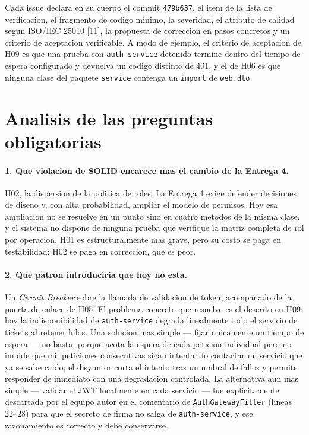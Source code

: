 \documentclass[10pt,a4paper]{article}
\newcommand{\commitCorto}{479b637}
\begin{document}
\noindent Cada issue declara en su cuerpo el commit \texttt{\commitCorto}, el item de la
lista de verificacion, el fragmento de codigo minimo, la severidad, el atributo de calidad
segun ISO/IEC 25010 [11], la propuesta de correccion en pasos concretos y un criterio de
aceptacion verificable. A modo de ejemplo, el criterio de aceptacion de H09 es que una
prueba con \texttt{auth-service} detenido termine dentro del tiempo de espera configurado y
devuelva un codigo distinto de 401, y el de H06 es que ninguna clase del paquete
\texttt{service} contenga un \texttt{import} de \texttt{web.dto}.

\section{Analisis de las preguntas obligatorias}

\paragraph{1. Que violacion de SOLID encarece mas el cambio de la Entrega 4.}
H02, la dispersion de la politica de roles. La Entrega 4 exige defender decisiones de diseno
y, con alta probabilidad, ampliar el modelo de permisos. Hoy esa ampliacion no se resuelve
en un punto sino en cuatro metodos de la misma clase, y el sistema no dispone de ninguna
prueba que verifique la matriz completa de rol por operacion. H01 es estructuralmente mas
grave, pero su costo se paga en testabilidad; H02 se paga en correccion, que es peor.

\paragraph{2. Que patron introduciria que hoy no esta.}
Un \emph{Circuit Breaker} sobre la llamada de validacion de token, acompanado de la puerta
de enlace de H05. El problema concreto que resuelve es el descrito en H09: hoy la
indisponibilidad de \texttt{auth-service} degrada linealmente todo el servicio de tickets al
retener hilos. Una solucion mas simple --- fijar unicamente un tiempo de espera --- no basta,
porque acota la espera de cada peticion individual pero no impide que mil peticiones
consecutivas sigan intentando contactar un servicio que ya se sabe caido; el disyuntor corta
el intento tras un umbral de fallos y permite responder de inmediato con una degradacion
controlada. La alternativa aun mas simple --- validar el JWT localmente en cada servicio ---
fue explicitamente descartada por el equipo autor en el comentario de
\texttt{AuthGatewayFilter} (lineas 22--28) para que el secreto de firma no salga de
\texttt{auth-service}, y ese razonamiento es correcto y debe conservarse.
\end{document}
